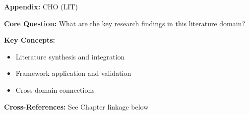 
\begin{tcolorbox}[colback=blue!5!white, colframe=blue!75!black,
    title=Quick Reference: Appendix CHO]
\textbf{Appendix:} CHO (LIT)

\textbf{Core Question:} What are the key research findings in this literature domain?

\textbf{Key Concepts:}
\begin{itemize}[nosep]
\item Literature synthesis and integration
\item Framework application and validation
\item Cross-domain connections
\end{itemize}

\textbf{Cross-References:} See Chapter linkage below
\end{tcolorbox}


\begin{abstract}
This appendix provides a systematic review and integration of key research findings
in the LIT domain. It synthesizes literature relevant to the Evidence-Based
Framework (EBF) and identifies connections to the 10C CORE architecture.
\end{abstract}


